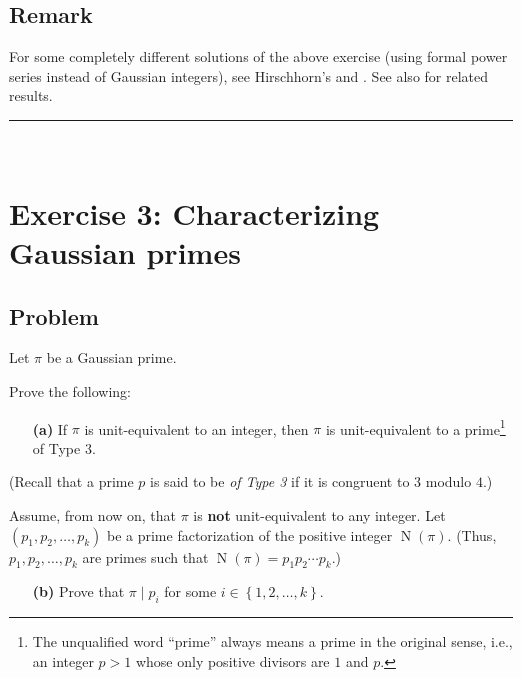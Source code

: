 \documentclass[paper=a4, fontsize=12pt]{scrartcl}%
\theoremstyle{plainsl}
\theoremstyle{definition}
\theoremstyle{remark}
\begin{document}
\subsection{Remark}

For some completely different solutions of the above exercise (using formal
power series instead of Gaussian integers), see Hirschhorn's \cite[Theorem
1]{Hirsch85} and \cite[Chapter 2]{Hirsch17}. See also \cite[Chapter
XIII]{Uspensky-Heaslet} for related results.

\rule{\linewidth}{0.3pt} \\[0.4cm]

\section{Exercise 3: Characterizing Gaussian primes}

\subsection{Problem}

Let $\pi$ be a Gaussian prime.

Prove the following:

\begin{enumerate}
\item[\textbf{(a)}] If $\pi$ is unit-equivalent to an integer, then $\pi$ is
unit-equivalent to a prime\footnote{The unqualified word ``prime'' always
means a prime in the original sense, i.e., an integer $p > 1$ whose only
positive divisors are $1$ and $p$.} of Type 3.
\end{enumerate}

\noindent(Recall that a prime $p$ is said to be \textit{of Type 3} if it is
congruent to $3$ modulo $4$.)

Assume, from now on, that $\pi$ is \textbf{not} unit-equivalent to any
integer. Let $\left(  p_{1}, p_{2}, \ldots, p_{k} \right)  $ be a prime
factorization of the positive integer $\operatorname{N}\left(  \pi\right)  $.
(Thus, $p_{1}, p_{2}, \ldots, p_{k}$ are primes such that $\operatorname{N}%
\left(  \pi\right)  = p_{1} p_{2} \cdots p_{k}$.)

\begin{enumerate}
\item[\textbf{(b)}] Prove that $\pi\mid p_{i}$ for some $i \in\left\{  1, 2,
\ldots, k \right\}  $.
\end{enumerate}
\end{document}
